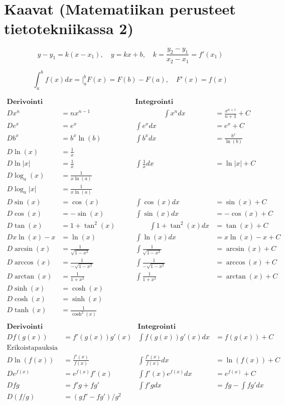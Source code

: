 \documentclass[12pt]{article}
\begin{document}
\section*{Kaavat (Matematiikan perusteet tietotekniikassa 2)}

$$y-y_1=k(x-x_1),\quad y=kx+b,\quad k=\frac{y_2-y_1}{x_2-x_1}=f'(x_1)$$

$$
\int_a^b f(x)dx=\bigg |_a^b F(x)=F(b)-F(a),\quad F'(x)=f(x)
$$

$$
\begin{array}{rl|rl}
\textbf{Derivointi} && \textbf{Integrointi}&\\[2mm]
Dx^n&=nx^{n-1}     \qquad\qquad&\qquad\qquad\int x^ndx&=\frac{x^{n+1}}{n+1}+C \\[2mm]
De^x&=e^x &\int e^xdx&=e^x+C\\[2mm]
Db^x&=b^x\ln(b) & \int b^xdx&=\frac{b^x}{\ln(b)}\\[2mm]
D\ln(x)&=\frac{1}{x} &&\\[2mm]
D\ln|x|&=\frac{1}{x} &\int\frac{1}{x}dx&=\ln|x|+C\\[2mm]
D\log_a(x)&=\frac{1}{x\ln(a)} &&\\[2mm]
D\log_a|x|&=\frac{1}{x\ln(a)} &&\\[2mm]
D\sin(x)&=\cos(x)   &\int\cos(x)dx&=\sin(x)+C\\[2mm]
D\cos(x)&=-\sin(x)  &\int\sin(x)dx&=-\cos(x)+C\\[2mm]
D\tan(x)&=1+\tan^2(x) \qquad&\qquad\int 1+\tan^2(x)dx&=\tan(x)+C\\[2mm]

Dx\ln(x)-x&=\ln(x) & \int\ln(x)dx&=x\ln(x)-x+C\\[10mm]

D\arcsin(x)&=\frac{1}{\sqrt{1-x^2}} & \int\frac{1}{\sqrt{1-x^2}}&=\arcsin(x)+C\\
D\arccos(x)&=\frac{1}{-\sqrt{1-x^2}} & \int\frac{1}{-\sqrt{1-x^2}}&=\arccos(x)+C\\
D\arctan(x)&=\frac{1}{1+x^2} & \int\frac{1}{1+x^2}&=\arctan(x)+C\\

D\sinh(x)&=\cosh(x) &&\\
D\cosh(x)&=\sinh(x) &&\\
D\tanh(x)&=\frac{1}{\cosh^2(x)} &&\\
\end{array}  
$$
\vspace{1cm}
$$
\begin{array}{rl|rl}
\textbf{Derivointi} && \textbf{Integrointi}&\\[2mm]
D f(g(x))&=f'(g(x))g'(x) & \int f(g(x))g'(x)dx&=f(g(x))+C\\[2mm]
\textrm{Erikoistapauksia} &&&\\
D\ln(f(x))&=\frac{f'(x)}{f(x)} & \int \frac{f'(x)}{f(x)}dx&=\ln(f(x))+C\\[2mm]
D e^{f(x)}&=e^{f(x)}f'(x) & \int f'(x)e^{f(x)}dx&=e^{f(x)}+C\\[10mm]
D fg&=f'g+fg'& \int f'g dx&=fg-\int fg'dx\\[2mm]
D (f/g)&=(gf'-fg')/g^2 &&\\[2mm]
\end{array}  
$$
\end{document}
